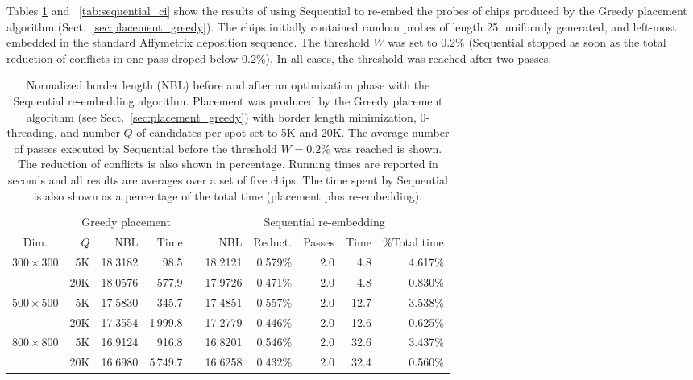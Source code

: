 Tables \ref{tab:sequential_bl} and ~\ref{tab:sequential_ci} show the results of
using Sequential to re-embed the probes of chips produced by the Greedy
placement algorithm (Sect.~\ref{sec:placement_greedy}). The chips initially
contained random probes of length 25, uniformly generated, and left-most
embedded in the standard Affymetrix deposition sequence.
The threshold $W$ was set to $0.2\%$ (Sequential stopped as soon as the total
reduction of conflicts in one pass droped below $0.2\%$). In all cases, the
threshold was reached after two passes.

\begin{table}[t]\centering
\caption{\label{tab:sequential_bl}
  Normalized border length (NBL) before and after an optimization phase with the
  Sequential re-embedding algorithm. Placement was produced by the Greedy
  placement algorithm (see Sect.~\ref{sec:placement_greedy}) with border length
  minimization, $0$-threading, and number $Q$ of candidates per spot set to 5K
  and 20K. The average number of passes executed by Sequential before the
  threshold $W=0.2\%$ was reached is shown. The reduction of conflicts is also
  shown in percentage. Running times are reported in seconds and all results are
  averages over a set of five chips. The time spent by Sequential is also shown
  as a percentage of the total time (placement plus re-embedding).}
\footnotesize{
\begin{tabular}{crrrlrrrrr}
\vspace{1pt}
     & \multicolumn{3}{c}{Greedy placement} & & \multicolumn{5}{c}{Sequential re-embedding} \\ \cline{2-4} \cline{6-10}
\vspace{1pt}
Dim. & $Q$ & NBL & Time & & NBL & Reduct. & Passes & Time & \%Total time \\
\hline
$300\times 300$ &  5K & 18.3182 &     98.5 & & 18.2121 & 0.579\% & 2.0 &  4.8 & 4.617\% \\
                & 20K & 18.0576 &    577.9 & & 17.9726 & 0.471\% & 2.0 &  4.8 & 0.830\% \\
\hline
$500\times 500$ &  5K & 17.5830 &    345.7 & & 17.4851 & 0.557\% & 2.0 & 12.7 & 3.538\% \\
                & 20K & 17.3554 & 1\,999.8 & & 17.2779 & 0.446\% & 2.0 & 12.6 & 0.625\% \\
\hline
$800\times 800$ &  5K & 16.9124 &    916.8 & & 16.8201 & 0.546\% & 2.0 & 32.6 & 3.437\% \\
                & 20K & 16.6980 & 5\,749.7 & & 16.6258 & 0.432\% & 2.0 & 32.4 & 0.560\% \\
\hline
\end{tabular}}
\end{table}

